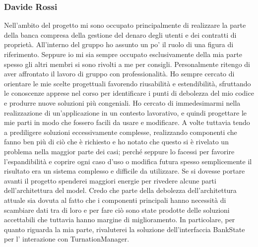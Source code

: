 \subsubsection{Davide Rossi}
Nell'ambito del progetto mi sono occupato principalmente di realizzare la parte della banca compresa della gestione del denaro degli utenti e
dei contratti di proprietà. All'interno del gruppo ho assunto un po' il ruolo di una figura di riferimento. 
Seppure io mi sia sempre occupato esclusivamente della mia parte spesso gli altri membri si sono rivolti a me per consigli.
Personalmente ritengo di aver affrontato il lavoro di gruppo con professionalità. 
Ho sempre cercato di orientare le mie scelte progettuali favorendo riusabilità e estendibilità, 
sfruttando le conoscenze apprese nel corso per identificare i punti di debolezza del mio codice e produrre nuove soluzioni più congeniali.
Ho cercato di immedesimarmi nella realizzazione di un’applicazione in un contesto lavorativo, 
e quindi progettare le mie parti in modo che fossero facili da usare e modificare. 
A volte tuttavia tendo a prediligere soluzioni eccessivamente complesse, 
realizzando componenti che fanno ben più di ciò che è richiesto e ho notato che 
questo si è rivelato un problema nella maggior parte dei casi; perché seppure lo facessi per favorire 
l’espandibilità e coprire ogni caso d'uso o modifica futura spesso semplicemente il risultato era un sistema complesso e difficile 
da utilizzare. 
Se si dovesse portare avanti il progetto spenderei maggiori energie per rivedere 
alcune parti dell’architettura del model. Credo che parte della debolezza 
dell’architettura attuale sia dovuta al fatto che i componenti principali hanno 
necessità di scambiare dati tra di loro e per fare ciò  sono state prodotte delle 
soluzioni accettabili che tuttavia hanno margine di miglioramento. 
In particolare, per quanto riguarda la mia parte, rivaluterei la soluzione dell'interfaccia BankState per l' interazione con
TurnationManager.

